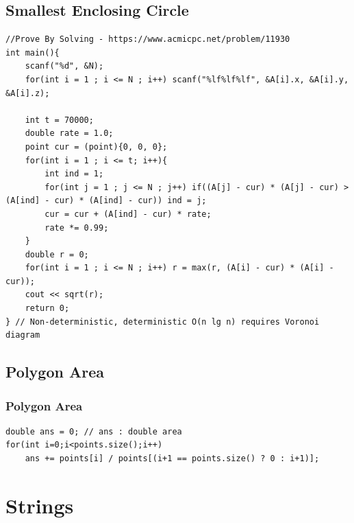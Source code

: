 \documentclass[landscape, 8pt, a4paper, oneside, twocolumn]{extarticle}
\begin{document}
\subsection{Smallest Enclosing Circle}
\begin{verbatim}
//Prove By Solving - https://www.acmicpc.net/problem/11930
int main(){
    scanf("%d", &N);
    for(int i = 1 ; i <= N ; i++) scanf("%lf%lf%lf", &A[i].x, &A[i].y, &A[i].z);
    
    int t = 70000;
    double rate = 1.0;
    point cur = (point){0, 0, 0};
    for(int i = 1 ; i <= t; i++){
        int ind = 1;
        for(int j = 1 ; j <= N ; j++) if((A[j] - cur) * (A[j] - cur) > (A[ind] - cur) * (A[ind] - cur)) ind = j;
        cur = cur + (A[ind] - cur) * rate;
        rate *= 0.99;
    }
    double r = 0;
    for(int i = 1 ; i <= N ; i++) r = max(r, (A[i] - cur) * (A[i] - cur));
    cout << sqrt(r);
    return 0;
} // Non-deterministic, deterministic O(n lg n) requires Voronoi diagram
\end{verbatim}
\subsection{Polygon Area}

\subsubsection{Polygon Area}
\begin{verbatim}
double ans = 0; // ans : double area
for(int i=0;i<points.size();i++)
    ans += points[i] / points[(i+1 == points.size() ? 0 : i+1)];
\end{verbatim}
\section{Strings}
\end{document}
